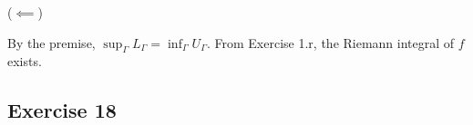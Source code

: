 \documentclass{article}
\begin{document}
($\impliedby$)

By the premise, $\sup_\Gamma L_\Gamma = \inf_\Gamma U_\Gamma$. From Exercise 1.r, the Riemann integral of $f$ exists.

\begin{comment}
    



Suppose a bounded $f$ is Riemann integrable on $I$, then $\inf_{\Gamma}U_{\Gamma}=\sup_{\Gamma}L_{\Gamma}=A$ where 
\begin{align*}
    U_{\Gamma}=\sum_{k=1}^{m}\sup_{x\in I_{k}} f(x)v(I_{k})\mbox{ , }\quad L_{\Gamma}=\sum_{k=1}^{m}\inf_{x\in I_{k}}f(x)v(I_{k}).
\end{align*}

By definition, we know that $U_{\Gamma}\geq L_{\Gamma}$. Thus, 
\begin{equation*}
    0\leq U_{\Gamma}-L_{\Gamma} = \sum_{i=1}^{m}\left(\sup_{x\in I_{k}}f(x)-\inf_{x\in I_{k}}f(x)\right)v(I_{k})
\end{equation*}
Taking limit of $|\Gamma|\to 0$, we have
\begin{align*}
     \lim_{|\Gamma|\to 0}(U_{\Gamma}-L_{\Gamma}) &= \lim_{|\Gamma|\to 0}\left(\sum_{k=1}^{m}\left(\sup_{x\in I_{k}}f(x)-\inf_{x\in I_{k}}f(x)\right)v(I_{k})\right) \\
     &= A-A \\
     &=0<\epsilon \mbox{ , since }f\mbox{ is Riemann integrable on } I.
\end{align*}
Thus, there is some $Γ$ such that $U_Γ - L_Γ < ϵ$. %

Conversely, suppose that given $\epsilon>0$, there is a partition $P$ of $I$ such that $0\leq U_{P}-L_{P}<\epsilon$. Suppose that $f$ is not Riemann-Integrable on $I$. Then
\[
\inf_{P}U_{P}>\sup_{P}L_{P}\implies \inf_{P}U_{P}-\sup_{P}L_{P}>0.
\]
Take $\inf_{P}U_{P}-\sup_{P}L_{P}=2\epsilon$, observe that
\begin{align*}
    U_{P}-L_{P}\geq \inf_{P}U_{P}-\sup_{P}L_{P}=2\epsilon>\epsilon,
\end{align*}
which is a contradiction. Therefore, $f$ is Riemann-Integrable on the interval $I$.

\end{comment}

\subsection{Exercise 18} %
\end{document}
